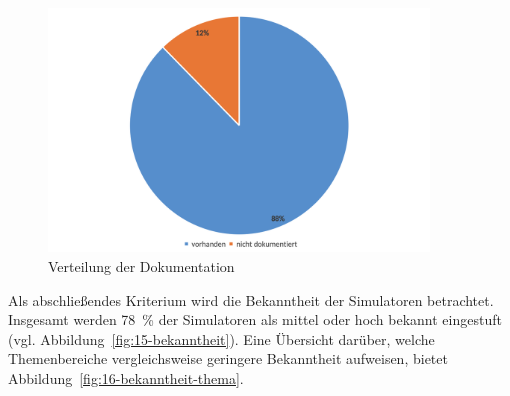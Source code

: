 \begin{figure}[!htbp]
    \centering
    \includegraphics[width=0.90\textwidth]{graphics_sim/14-dokumentation.png}
    \caption{Verteilung der Dokumentation}
    \label{fig:14-dokumentation}
\end{figure}

Als abschließendes Kriterium wird die Bekanntheit der Simulatoren betrachtet. Insgesamt werden 78~\% der Simulatoren als mittel oder hoch bekannt eingestuft (vgl. Abbildung~\ref{fig:15-bekanntheit}). Eine Übersicht darüber, welche Themenbereiche vergleichsweise geringere Bekanntheit aufweisen, bietet Abbildung~\ref{fig:16-bekanntheit-thema}.

